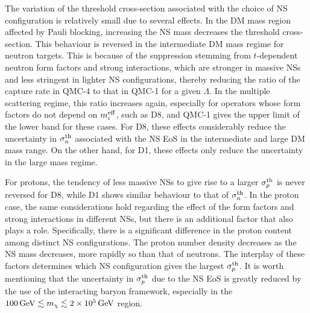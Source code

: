 The variation of the threshold cross-section associated with the choice of NS configuration is relatively small due to several effects. In the DM mass region affected by Pauli blocking, increasing the NS mass decreases the threshold cross-section. This behaviour is reversed in the intermediate DM mass regime for neutron targets. This is because of the suppression stemming from $t$-dependent neutron form factors and strong interactions, which are stronger in massive NSs and less stringent in lighter NS configurations, thereby reducing the ratio of the capture rate in QMC-4 to that in QMC-1 for a given $\Lambda$. In the multiple scattering regime, this ratio increases again, especially for operators whose form factors do not depend on $m_i^{\rm eff}$, such as D8, and  QMC-1 gives the upper limit of the lower band for these cases. For D8, these effects considerably reduce the uncertainty in $\sigma^\mathrm{th}_n$ associated with the NS EoS in the intermediate and large DM mass range. On the other hand, for D1, these effects only reduce the uncertainty in the large mass regime. 

For protons, the tendency of less massive NSs to give rise to a larger $\sigma^\mathrm{th}_p$ is never reversed for D8, while D1 shows similar behaviour to that of $\sigma^\mathrm{th}_n$. In the proton case, the same considerations hold regarding the effect of the form factors and strong interactions in different NSs, but there is an additional factor that also plays a role. Specifically, there is a significant difference in the proton content among distinct NS configurations. The proton number density decreases as the NS mass decreases, more rapidly so than that of neutrons. The interplay of these factors determines which NS configuration gives the largest $\sigma^\mathrm{th}_p$. It is worth mentioning that the uncertainty in $\sigma^\mathrm{th}_p$ due to the NS EoS is greatly reduced by the use of the interacting baryon framework, especially in the $100{\rm \,GeV}\lesssim m_\chi\lesssim2\times10^5{\rm \,GeV}$ region. 


